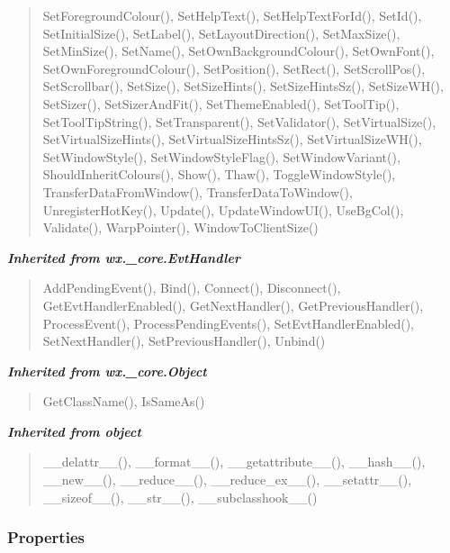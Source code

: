 \begin{quote}
SetForegroundColour(), SetHelpText(), SetHelpTextForId(), SetId(), SetInitialSize(), SetLabel(), SetLayoutDirection(), SetMaxSize(), SetMinSize(), SetName(), SetOwnBackgroundColour(), SetOwnFont(), SetOwnForegroundColour(), SetPosition(), SetRect(), SetScrollPos(), SetScrollbar(), SetSize(), SetSizeHints(), SetSizeHintsSz(), SetSizeWH(), SetSizer(), SetSizerAndFit(), SetThemeEnabled(), SetToolTip(), SetToolTipString(), SetTransparent(), SetValidator(), SetVirtualSize(), SetVirtualSizeHints(), SetVirtualSizeHintsSz(), SetVirtualSizeWH(), SetWindowStyle(), SetWindowStyleFlag(), SetWindowVariant(), ShouldInheritColours(), Show(), Thaw(), ToggleWindowStyle(), TransferDataFromWindow(), TransferDataToWindow(), UnregisterHotKey(), Update(), UpdateWindowUI(), UseBgCol(), Validate(), WarpPointer(), WindowToClientSize()
\end{quote}

\large{\textbf{\textit{Inherited from wx.\_core.EvtHandler}}}

\begin{quote}
AddPendingEvent(), Bind(), Connect(), Disconnect(), GetEvtHandlerEnabled(), GetNextHandler(), GetPreviousHandler(), ProcessEvent(), ProcessPendingEvents(), SetEvtHandlerEnabled(), SetNextHandler(), SetPreviousHandler(), Unbind()
\end{quote}

\large{\textbf{\textit{Inherited from wx.\_core.Object}}}

\begin{quote}
GetClassName(), IsSameAs()
\end{quote}

\large{\textbf{\textit{Inherited from object}}}

\begin{quote}
\_\_delattr\_\_(), \_\_format\_\_(), \_\_getattribute\_\_(), \_\_hash\_\_(), \_\_new\_\_(), \_\_reduce\_\_(), \_\_reduce\_ex\_\_(), \_\_setattr\_\_(), \_\_sizeof\_\_(), \_\_str\_\_(), \_\_subclasshook\_\_()
\end{quote}


  \subsubsection{Properties}

